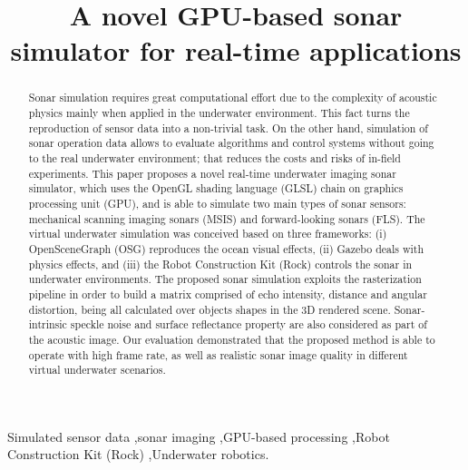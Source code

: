 \documentclass[final,5p,times]{elsarticle}
\begin{document}
\begin{frontmatter}


\title{A novel GPU-based sonar simulator for real-time applications}



\begin{abstract}

Sonar simulation requires great computational effort due to the complexity of
acoustic physics mainly when applied in the underwater environment. This fact
turns the reproduction of sensor data into a non-trivial task. On the other
hand, simulation of sonar operation data allows to evaluate algorithms and
control systems without going to the real underwater environment; that reduces
the costs and risks of in-field experiments. This paper proposes a novel
real-time underwater imaging sonar simulator, which uses the OpenGL shading
language (GLSL) chain on graphics processing unit (GPU), and is able to
simulate two main types of sonar sensors: mechanical scanning imaging sonars
(MSIS) and forward-looking sonars (FLS). The virtual underwater simulation was
conceived based on three frameworks: (i) OpenSceneGraph (OSG) reproduces the
ocean visual effects, (ii) Gazebo deals with physics effects, and (iii) the
Robot Construction Kit (Rock) controls the sonar in underwater environments.
The proposed sonar simulation exploits the rasterization pipeline in order
to build a matrix comprised of echo intensity, distance and angular distortion,
being all calculated over objects shapes in the 3D rendered scene.
Sonar-intrinsic speckle noise and surface reflectance property are also
considered as part of the acoustic image. Our evaluation demonstrated that the
proposed method is able to operate with high frame rate, as well as realistic
sonar image quality in different virtual underwater scenarios.

\end{abstract}

\begin{keyword}
Simulated sensor data
\sep sonar imaging
\sep GPU-based processing
\sep Robot Construction Kit (Rock)
\sep Underwater robotics.

\end{keyword}

\end{frontmatter}
\end{document}
